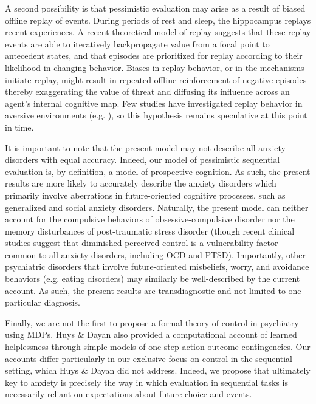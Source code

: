 \documentclass[11pt]{article} %
\begin{document}
A second possibility is that pessimistic evaluation may arise as a result of biased offline replay of events. During periods of rest and sleep, the hippocampus replays recent experiences\citep{whats a good ref?}. A recent theoretical model of replay suggests that these replay events are able to iteratively backpropagate value from a focal point to antecedent states, and that episodes are prioritized for replay according to their likelihood in changing behavior. Biases in replay behavior, or in the mechanisms initiate replay, might result in repeated offline reinforcement of negative episodes thereby exaggerating the value of threat and diffusing its influence across an agent's internal cognitive map. Few studies have investigated replay behavior in aversive environments (e.g. \citep{wu2017}), so this hypothesis remains speculative at this point in time.   


It is important to note that the present model may not describe all anxiety disorders with equal accuracy. Indeed, our model of pessimistic sequential evaluation is, by definition, a model of prospective cognition. As such, the present results are more likely to accurately describe the anxiety disorders which primarily involve aberrations in future-oriented cognitive processes, such as generalized and social anxiety disorders. Naturally, the present model can neither account for the compulsive behaviors of obsessive-compulsive disorder nor the memory disturbances of post-traumatic stress disorder (though recent clinical studies suggest that diminished perceived control is a vulnerability factor common to all anxiety disorders, including OCD and PTSD)\citep{gallagher2014a, gallagher2014b}. Importantly, other psychiatric disorders that involve future-oriented misbeliefs, worry, and avoidance behaviors (e.g. eating disorders\citep{konstantellou2011}) may similarly be well-described by the current account. As such, the present results are transdiagnostic and not limited to one particular diagnosis. 

Finally, we are not the first to propose a formal theory of control in psychiatry using MDPs. Huys \& Dayan \cite{HuysDayan2009} also provided a computational account of learned helplessness through simple models of one-step action-outcome contingencies. Our accounts differ particularly in our exclusive focus on control in the sequential setting, which Huys \& Dayan did not address. Indeed, we propose that ultimately key to anxiety is precisely the way in which evaluation in sequential tasks is necessarily reliant on expectations about future choice and events.


\small{}
\end{document}
